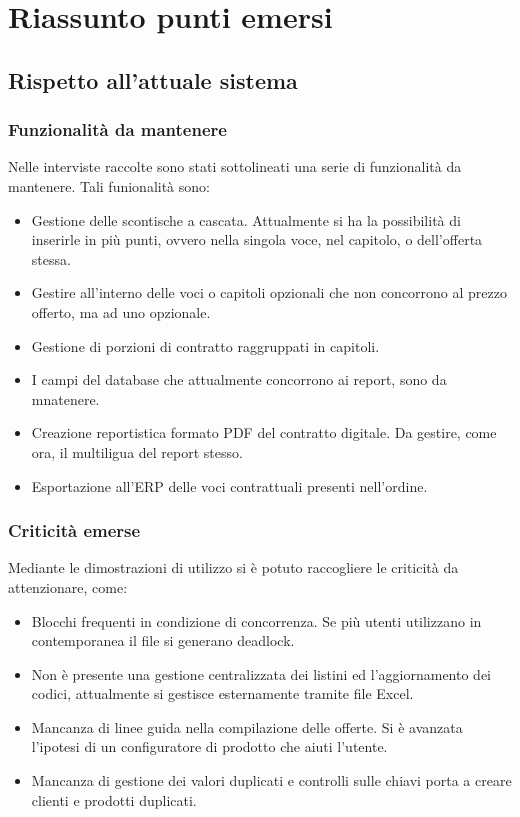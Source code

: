 \section{Riassunto punti emersi}
\subsection{Rispetto all'attuale sistema}
\subsubsection{Funzionalità da mantenere}
Nelle interviste raccolte sono stati sottolineati una serie di funzionalità da mantenere.
Tali funionalità sono:
\begin{itemize}
    \item Gestione delle scontische a cascata. Attualmente si ha la possibilità di inserirle in più punti, ovvero nella singola voce, nel capitolo,
    o dell'offerta stessa.
    \item Gestire all'interno delle voci o capitoli opzionali che non concorrono al prezzo offerto, ma ad uno opzionale.
    \item Gestione di porzioni di contratto raggruppati in capitoli.
    \item I campi del database che attualmente concorrono ai report, sono da mnatenere.
    \item Creazione reportistica formato PDF del contratto digitale. Da gestire, come ora, il multiligua del report stesso.
    \item Esportazione all'\ac{ERP} delle voci contrattuali presenti nell'ordine.
\end{itemize}
\subsubsection{Criticità emerse}
Mediante le dimostrazioni di utilizzo si è potuto raccogliere le 
criticità da attenzionare, come:
\begin{itemize}
    \item Blocchi frequenti in condizione di concorrenza. Se più utenti utilizzano in contemporanea il file si generano deadlock.
    \item Non è presente una gestione centralizzata dei listini ed l'aggiornamento dei codici, attualmente si gestisce esternamente tramite file Excel.
    \item Mancanza di linee guida nella compilazione delle offerte. Si è avanzata l'ipotesi di un configuratore di prodotto che aiuti l'utente.
    \item Mancanza di gestione dei valori duplicati e controlli sulle chiavi porta a creare clienti e prodotti duplicati.
\end{itemize}
